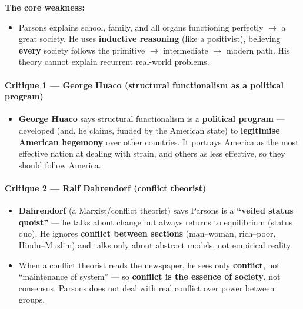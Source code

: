 \begin{CriticalPoint}
\textbf{The core weakness:}
\begin{itemize}
\item Parsons explains school, family, and all organs functioning perfectly $\rightarrow$ a great society. He uses \textbf{inductive reasoning} (like a positivist), believing \textbf{every} society follows the primitive $\rightarrow$ intermediate $\rightarrow$ modern path. His theory cannot explain recurrent real-world problems.
\end{itemize}
\end{CriticalPoint}

\paragraph{Critique 1 --- George Huaco (structural functionalism as a political program)}
\begin{CriticalPoint}
\begin{itemize}
\item \textbf{George Huaco} says structural functionalism is a \textbf{political program} --- developed (and, he claims, funded by the American state) to \textbf{legitimise American hegemony} over other countries. It portrays America as the most effective nation at dealing with strain, and others as less effective, so they should follow America.
\end{itemize}
\end{CriticalPoint}

\paragraph{Critique 2 --- Ralf Dahrendorf (conflict theorist)}
\begin{CriticalPoint}
\begin{itemize}
\item \textbf{Dahrendorf} (a Marxist/conflict theorist) says Parsons is a \textbf{``veiled status quoist''} --- he talks about change but always returns to equilibrium (status quo). He ignores \textbf{conflict between sections} (man--woman, rich--poor, Hindu--Muslim) and talks only about abstract models, not empirical reality.
\item When a conflict theorist reads the newspaper, he sees only \textbf{conflict}, not ``maintenance of system'' --- so \textbf{conflict is the essence of society}, not consensus. Parsons does not deal with real conflict over power between groups.
\end{itemize}
\end{CriticalPoint}


